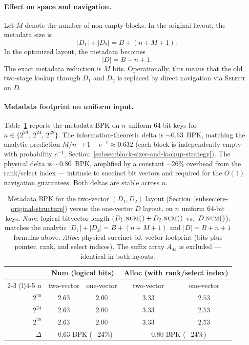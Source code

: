 \paragraph{Effect on space and navigation.}
Let $M$ denote the number of non-empty blocks.
In the original layout, the metadata size is
\[
    |D_1| + |D_2| = B + (n + M + 1).
\]
In the optimized layout, the metadata becomes
\[
    |D| = B + n + 1.
\]
The exact metadata reduction is $M$ bits.
Operationally, this means that the old two-stage lookup through $D_1$
and $D_2$ is replaced by direct navigation via \textsc{Select} on $D$.

\paragraph{Metadata footprint on uniform input.}
Table~\ref{tab:ere-metadata-bpk} reports the metadata BPK on $n$
uniform 64-bit keys for $n \in \{2^{20},\ 2^{24},\ 2^{28}\}$.
The information-theoretic delta is ${\sim}0.63$~BPK, matching the
analytic prediction $M/n \to 1 - e^{-1} \approx 0.632$
(each block is independently empty with probability $e^{-1}$,
Section~\ref{subsec:block-sizes-and-lookup-strategy}).
The physical delta is ${\sim}0.80$~BPK, amplified by a constant
${\sim}26\%$ overhead from the rank/select index --- intrinsic to
succinct bit vectors and required for the $O(1)$ navigation
guarantees.
Both deltas are stable across $n$.

\begin{table}[H]
    \centering
    \begin{tabular}{@{}rcc@{\hskip 24pt}cc@{}}
        \toprule
        & \multicolumn{2}{c}{\textbf{Num} (logical bits)} & \multicolumn{2}{c}{\textbf{Alloc} (with rank/select index)} \\
        \cmidrule(r){2-3} \cmidrule(l){4-5}
        $n$      & two-vector & one-vector & two-vector & one-vector \\
        \midrule
        $2^{20}$ & $2.63$     & $2.00$     & $3.33$     & $2.53$     \\
        $2^{24}$ & $2.63$     & $2.00$     & $3.33$     & $2.53$     \\
        $2^{28}$ & $2.63$     & $2.00$     & $3.33$     & $2.53$     \\
        \midrule
        $\Delta$ & \multicolumn{2}{c}{$-0.63$ BPK ($-24\%$)} & \multicolumn{2}{c}{$-0.80$ BPK ($-24\%$)} \\
        \bottomrule
    \end{tabular}
    \caption{Metadata BPK for the two-vector $(D_1, D_2)$ layout
        (Section~\ref{subsec:ere-original-structure}) versus the
        one-vector $D$ layout, on $n$ uniform 64-bit keys.
        \emph{Num}: logical bitvector length ($D_1.\textsc{num()} + D_2.\textsc{num()}$
        vs.\ $D.\textsc{num()}$); matches the analytic
        $|D_1|+|D_2| = B + (n + M + 1)$ and $|D| = B + n + 1$ formulas above.
        \emph{Alloc}: physical succinct-bit-vector footprint (bits plus
        pointer, rank, and select indices). The suffix array $A_{ds}$ is
        excluded --- identical in both layouts.}
    \label{tab:ere-metadata-bpk}
\end{table}

